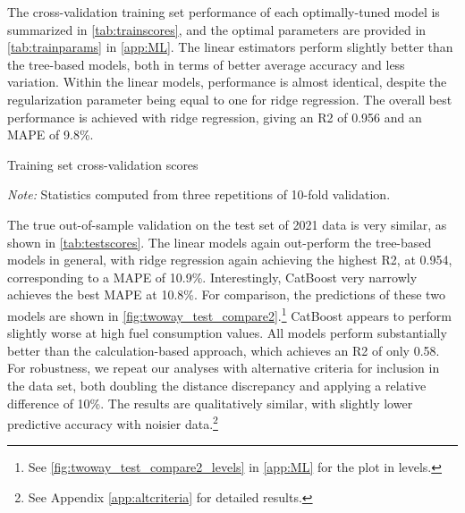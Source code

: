 The cross-validation training set performance of each optimally-tuned model is summarized in \autoref{tab:trainscores}, and the optimal parameters are provided in \autoref{tab:trainparams} in \autoref{app:ML}. The linear estimators perform slightly better than the tree-based models, both in terms of better average accuracy and less variation. Within the linear models, performance is almost identical, despite the regularization parameter being equal to one for ridge regression.
The overall best performance is achieved with ridge regression, giving an \ac{R2} of 0.956 and an \ac{MAPE} of 9.8\%. 

\begin{table}
    \centering
    \begin{adjustbox}{max width=\textwidth}
    \begin{threeparttable}
        \caption{Training set cross-validation scores}
        \label{tab:trainscores}
        
        \begin{tablenotes}[flushleft]\small
            \item \textit{Note:} Statistics computed from three repetitions of 10-fold validation.
        \end{tablenotes}
    \end{threeparttable}
    \end{adjustbox}
\end{table}

The true out-of-sample validation on the test set of 2021 data is very similar, as shown in \autoref{tab:testscores}. The linear models again out-perform the tree-based models in general, with ridge regression again achieving the highest \ac{R2}, at 0.954, corresponding to a \ac{MAPE} of 10.9\%. Interestingly, CatBoost very narrowly achieves the best \ac{MAPE} at 10.8\%. For comparison, the predictions of these two models are shown in \autoref{fig:twoway_test_compare2}.\footnote{See \autoref{fig:twoway_test_compare2_levels} in \autoref{app:ML} for the plot in levels.} CatBoost appears to perform slightly worse at high fuel consumption values. All models perform substantially better than the calculation-based approach, which achieves an \ac{R2} of only 0.58. For robustness, we repeat our analyses with alternative criteria for inclusion in the data set, both doubling the distance discrepancy and applying a relative difference of 10\%. The results are qualitatively similar, with slightly lower predictive accuracy with noisier data.\footnote{See Appendix \ref{app:altcriteria} for detailed results.}

